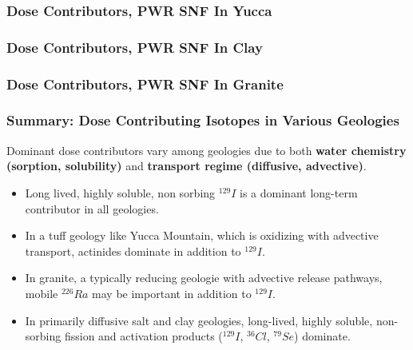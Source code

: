 
\begin{frame}
  \frametitle{Dose Contributors, PWR SNF In Yucca}
\footnotesize{
  
}
\end{frame}

\begin{frame}
  \frametitle{Dose Contributors, PWR SNF In Clay}
\footnotesize{
  
}
\end{frame}

\begin{frame}
  \frametitle{Dose Contributors, PWR SNF In Granite}
\footnotesize{
  
}
\end{frame}

\begin{frame}
  \frametitle{Summary: Dose Contributing Isotopes in Various Geologies}
Dominant dose contributors vary among geologies due to both \textbf{water chemistry (sorption, solubility)} and \textbf{transport regime (diffusive, advective)}. 
\begin{itemize}
  \item Long lived, highly soluble, non sorbing $^{129}I$ is a dominant long-term
contributor in all geologies.
  \item In a tuff geology like Yucca Mountain, which is oxidizing with advective transport, actinides dominate in addition to $^{129}I$.
  \item In granite, a typically reducing geologie with advective release pathways, mobile $^{226}Ra$ may be important in addition to $^{129}I$.
  \item In primarily diffusive salt and clay geologies, long-lived, highly soluble, non-sorbing fission and activation products ($^{129}I$, $^{36}Cl$, $^{79}Se$)  dominate. 
\end{itemize}
\end{frame}
